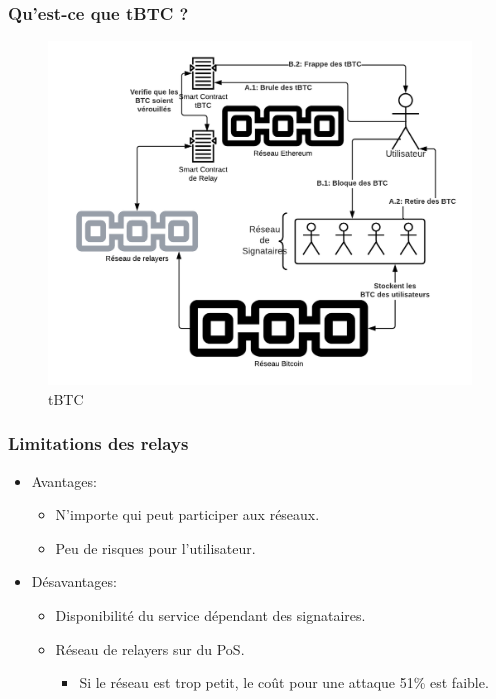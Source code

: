 \begin{frame}
  \frametitle{Qu’est-ce que tBTC ?}
  \begin{figure}
    \centering
    \includegraphics[scale = 0.22]{decentralisation/tBTC.png}
    \caption{tBTC}
  \end{figure}
\end{frame}

\begin{frame}
  \frametitle{Limitations des relays}
  \begin{itemize}
    \item Avantages:
    \begin{itemize}
      \item N'importe qui peut participer aux réseaux.
      \item Peu de risques pour l'utilisateur.
    \end{itemize}
    \item Désavantages:
    \begin{itemize}
      \item Disponibilité du service dépendant des signataires.
      \item Réseau de relayers sur du PoS.
      \begin{itemize}
        \item Si le réseau est trop petit, le coût pour une attaque 51\% est faible.
      \end{itemize}
    \end{itemize}  
  \end{itemize}
\end{frame}